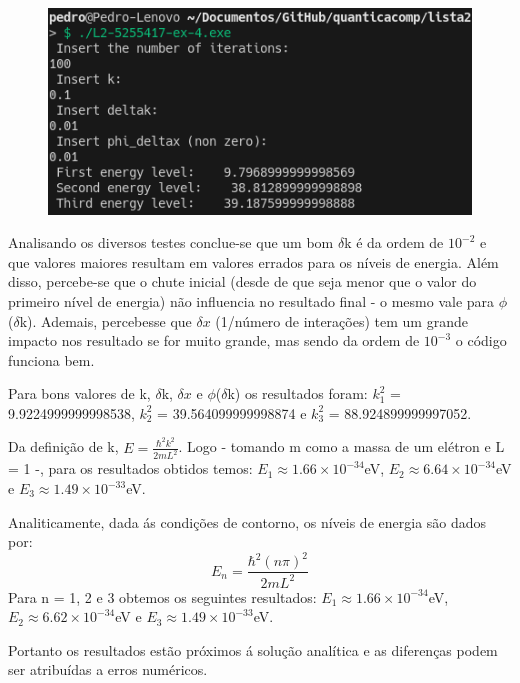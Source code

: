 \documentclass[12pt, a4paper]{article} %
\begin{document}
        \begin{figure}[H]    
            \centering
            \includegraphics[scale=0.8]{../images/results-ex4-7.png}
            \caption{}
        \end{figure}


    Analisando os diversos testes conclue-se que um bom $\delta$k \'e da ordem de $10^{-2}$ e que valores maiores resultam em valores errados para os n\'iveis de energia. Al\'em disso, percebe-se que o chute inicial (desde de que seja menor que o valor do primeiro n\'ivel de energia) n\~ao influencia no resultado final - o mesmo vale para $\phi$($\delta$k). Ademais, percebesse que $\delta x$ (1/n\'umero de intera\c{c}\~oes) tem um grande impacto nos resultado se for muito grande, mas sendo da ordem de $10^{-3}$ o c\'odigo funciona bem.
    
    Para bons valores de k, $\delta$k, $\delta x$ e $\phi$($\delta$k) os resultados foram: $k^{2}_{1}$ = 9.9224999999998538, $k^{2}_{2}$ = 39.564099999998874 e $k^{2}_{3}$ = 88.924899999997052.
    
    Da defini\c{c}\~ao de k, $E = \frac{\hbar^2k^2}{2mL^2}$. Logo - tomando m como a massa de um el\'etron e L = 1 -, para os resultados obtidos temos: $E_{1} \approx 1.66 \times 10^{-34}$eV, $E_{2} \approx 6.64 \times 10^{-34}$eV e $E_{3} \approx 1.49 \times 10^{-33}$eV.
    
    Analiticamente, dada \'{a}s condi\c{c}\~oes de contorno, os n\'iveis de energia s\~ao dados por:
    \begin{equation}
        E_{n} = \frac{\hbar^2(n \pi)^2}{2mL^2}
    \end{equation}
    Para n = 1, 2 e 3 obtemos os seguintes resultados: $E_{1} \approx 1.66 \times 10^{-34}$eV, $E_{2} \approx 6.62 \times 10^{-34}$eV e $E_{3} \approx 1.49 \times 10^{-33}$eV.

    Portanto os resultados est\~ao pr\'oximos \'{a} solu\c{c}\~ao anal\'itica e as diferen\c{c}as podem ser atribu\'idas a erros num\'ericos.
\end{document}
